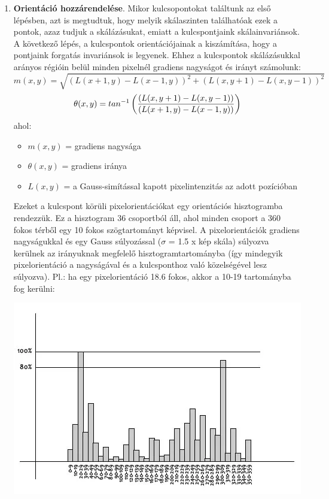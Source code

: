 \documentclass[12pt]{report}
\begin{document}
\begin{enumerate}
\begin{enumerate}
                                \item \textbf{Orientáció hozzárendelése}. Mikor kulcsopontokat találtunk az első lépésben, azt is megtudtuk, hogy melyik skálaszinten találhatóak ezek a pontok, azaz tudjuk a skálázásukat, emiatt a kulcspontjaink skálainvariánsok. A következő lépés, a kulcspontok orientációjainak a kiszámítása, hogy a pontjaink forgatás invariánsok is legyenek. Ehhez a kulcspontok skálázásukkal arányos régióin belül minden pixelnél gradiens nagyságot és irányt számolunk:
                                            \[m(x,y) = \sqrt{(L(x+1,y) - L(x-1,y))^2 + (L(x,y+1) - L(x,y-1))^2}\]
                                            \[\theta(x,y)=tan^{-1}\left({(L(x,y+1) - L(x,y-1))\over{(L(x+1,y) - L(x-1,y))}}\right)\]
                                    ahol:
                                    \begin{itemize}
                                        \item $m(x,y)$ = gradiens nagysága
                                        \item $\theta(x,y)$ = gradiens iránya
                                        \item $L(x,y)$ = a Gauss-simítással kapott pixelintenzitás az adott pozícióban
                                    \end{itemize}
                                    Ezeket a kulcspont körüli pixelorientációkat egy orientációs hisztogramba rendezzük. Ez a hisztogram 36 csoportból áll, ahol minden csoport a 360 fokos térből egy 10 fokos szögtartományt képvisel. A pixelorientációk gradiens nagyságukkal és egy Gauss súlyozással ($\sigma$ = 1.5 x kép skála) súlyozva kerülnek az irányuknak megfelelő hisztogramtartományba (így mindegyik pixelorientáció a nagyságával és a kulcsponthoz való közelségével lesz súlyozva). Pl.: ha egy pixelorientáció 18.6 fokos, akkor a 10-19 tartományba fog kerülni:
                                    \begin{center}
                                        \includegraphics[scale=0.7]{orientation_histogram.png}

\end{center}
\end{enumerate}
\end{enumerate}
\end{document}
